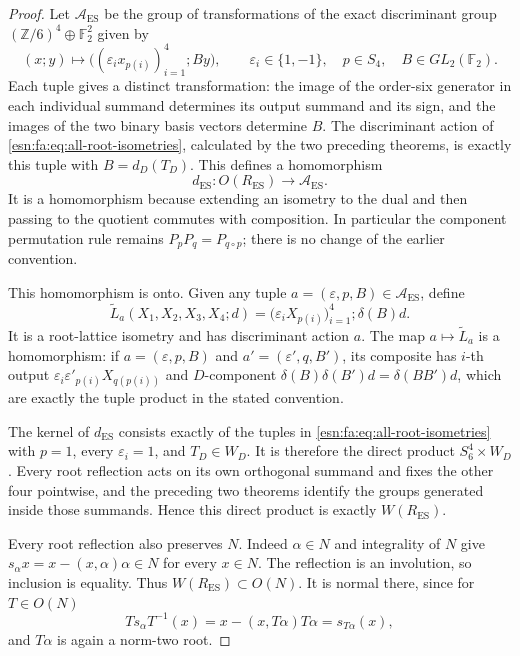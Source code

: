 \begin{proof}
Let \(\mathcal A_{\mathrm{ES}}\) be the group of transformations
of the exact discriminant group
\((\mathbb Z/6)^4\oplus\mathbb F_2^2\) given by
\[
 (x;y)\longmapsto
        \bigl((\varepsilon_i x_{p(i)})_{i=1}^4;By\bigr),
 \qquad \varepsilon_i\in\{1,-1\},\quad p\in S_4,
                 \quad B\in GL_2(\mathbb F_2).
\]
Each tuple gives a distinct transformation: the image of the order-six
generator in each individual summand determines its output summand
and its sign, and the images of the two binary basis vectors determine
\(B\).  The discriminant action of
\eqref{esn:fa:eq:all-root-isometries}, calculated by the two preceding
theorems, is exactly this tuple with \(B=d_D(T_D)\).
This defines a homomorphism
\[
 d_{\mathrm{ES}}:O(R_{\mathrm{ES}})\longrightarrow
                                      \mathcal A_{\mathrm{ES}}.
\]
It is a homomorphism because extending an isometry to the dual and then
passing to the quotient commutes with composition.  In particular the
component permutation rule remains
\(P_pP_q=P_{q\circ p}\); there is no change of the earlier convention.

This homomorphism is onto.  Given any tuple
\(a=(\varepsilon,p,B)\in\mathcal A_{\mathrm{ES}}\), define
\[
 \widetilde L_a(X_1,X_2,X_3,X_4;d)
   =\bigl(\varepsilon_iX_{p(i)}\bigr)_{i=1}^4
                                     \mathbin{;}\delta(B)d.
\]
It is a root-lattice isometry and has discriminant action \(a\).
The map \(a\mapsto\widetilde L_a\) is a homomorphism: if
\(a=(\varepsilon,p,B)\) and \(a'=(\varepsilon',q,B')\),
its composite has \(i\)-th output
\(\varepsilon_i\varepsilon'_{p(i)}X_{q(p(i))}\)
and \(D\)-component \(\delta(B)\delta(B')d=\delta(BB')d\),
which are exactly the tuple product in the stated convention.

The kernel of \(d_{\mathrm{ES}}\) consists exactly of the tuples
in \eqref{esn:fa:eq:all-root-isometries} with
\(p=1\), every \(\varepsilon_i=1\), and \(T_D\in W_D\).
It is therefore the direct product \(S_6^4\times W_D\).
Every root reflection acts on its own orthogonal summand and fixes
the other four pointwise, and the preceding two theorems identify the
groups generated inside those summands.  Hence this direct product
is exactly \(W(R_{\mathrm{ES}})\).

Every root reflection also preserves \(N\).  Indeed \(\alpha\in N\)
and integrality of \(N\) give
\(s_\alpha x=x-(x,\alpha)\alpha\in N\) for every \(x\in N\).
The reflection is an involution, so inclusion is equality.
Thus \(W(R_{\mathrm{ES}})\subset O(N)\).
It is normal there, since for \(T\in O(N)\)
\[
 Ts_\alpha T^{-1}(x)
   =x-(x,T\alpha)T\alpha=s_{T\alpha}(x),
\]
and \(T\alpha\) is again a norm-two root.


\end{proof}
